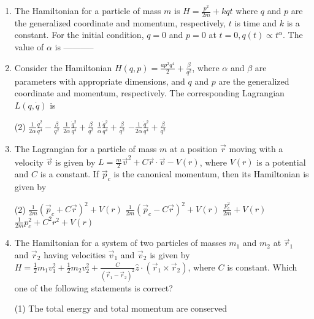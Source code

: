 \begin{enumerate}
\begin{tasks}
	\end{tasks}
	\item  The Hamiltonian for a particle of mass $m$ is $H=\frac{p^{2}}{2 m}+k q t$ where $q$ and $p$ are the generalized coordinate and momentum, respectively, $t$ is time and $k$ is a constant. For the initial condition, $q=0$ and $p=0$ at $t=0, q(t) \propto t^{\alpha}$. The value of $\alpha$ is -----------
	{}
	\item  Consider the Hamiltonian $H(q, p)=\frac{a p^{2} q^{4}}{2}+\frac{\beta}{q^{2}}$, where $\alpha$ and $\beta$ are parameters with appropriate dimensions, and $q$ and $p$ are the generalized coordinate and momentum, respectively. The corresponding Lagrangian $L(q, \dot{q})$ is
	{}
	\begin{tasks}(2)
		\task[\textbf{a.}] $\frac{1}{2 \alpha} \frac{\dot{q}^{2}}{q^{4}}-\frac{\beta}{q^{2}}$
		\task[\textbf{b.}]$\frac{1}{2 \alpha} \frac{\dot{q}^{2}}{q^{4}}+\frac{\beta}{q^{2}}$
		\task[\textbf{c.}]$\frac{1}{\alpha} \frac{\dot{q}^{2}}{q^{4}}+\frac{\beta}{q^{2}}$
		\task[\textbf{d.}] $-\frac{1}{2 \alpha} \frac{\dot{q}^{2}}{q^{4}}+\frac{\beta}{q^{2}}$
	\end{tasks}
	\item  The Lagrangian for a particle of mass $m$ at a position $\vec{r}$ moving with a velocity $\vec{v}$ is given by $L=\frac{m}{2} \vec{v}^{2}+C \vec{r} \cdot \vec{v}-V(r)$, where $V(r)$ is a potential and $C$ is a constant. If $\vec{p}_{c}$ is the canonical momentum, then its Hamiltonian is given by
	{}
	\begin{tasks}(2)
		\task[\textbf{a.}]$\frac{1}{2 m}\left(\vec{p}_{c}+C \vec{r}\right)^{2}+V(r)$
		\task[\textbf{b.}]$\frac{1}{2 m}\left(\vec{p}_{c}-C \vec{r}\right)^{2}+V(r)$
		\task[\textbf{c.}]$\frac{p_{c}^{2}}{2 m}+V(r)$
		\task[\textbf{d.}]  $\frac{1}{2 m} p_{c}^{2}+C^{2} r^{2}+V(r)$
	\end{tasks}
	\item  The Hamiltonian for a system of two particles of masses $m_{1}$ and $m_{2}$ at $\vec{r}_{1}$ and $\vec{r}_{2}$ having velocities $\vec{v}_{1}$ and $\vec{v}_{2}$ is given by $H=\frac{1}{2} m_{1} v_{1}^{2}+\frac{1}{2} m_{2} v_{2}^{2}+\frac{C}{\left(\vec{r}_{1}-\vec{r}_{2}\right)^{2}} \hat{z} \cdot\left(\vec{r}_{1} \times \vec{r}_{2}\right)$, where $C$ is constant. Which one of the following statements is correct?
	{}
	\begin{tasks}(1)
		\task[\textbf{a.}] The total energy and total momentum are conserved

\end{tasks}
\end{enumerate}
